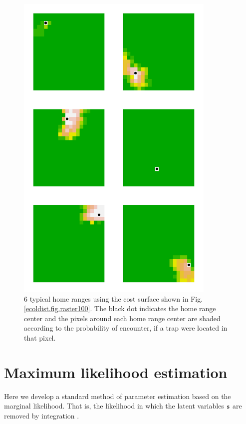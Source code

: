 \documentclass[12pt]{article}
\begin{document}
\begin{figure}
\begin{center}
\includegraphics[height=6in,width=3.75in]{figs/home_ranges}
\end{center}
\caption{
6 typical home ranges using the cost surface shown in
  Fig. \ref{ecoldist.fig.raster100}. The black dot indicates the home
  range center and the pixels around each home range center are shaded
according to the probability of encounter, if a trap were located in
that pixel. 
}
\label{fig.homeranges}
\end{figure}




\section{Maximum likelihood estimation}
\label{sec.mle}

Here we develop a standard method of parameter estimation based on
the marginal likelihood. That is, the likelihood in which the latent
variables ${\bf s}$ are removed by integration \citep{borchers_efford:2008}.
\end{document}
